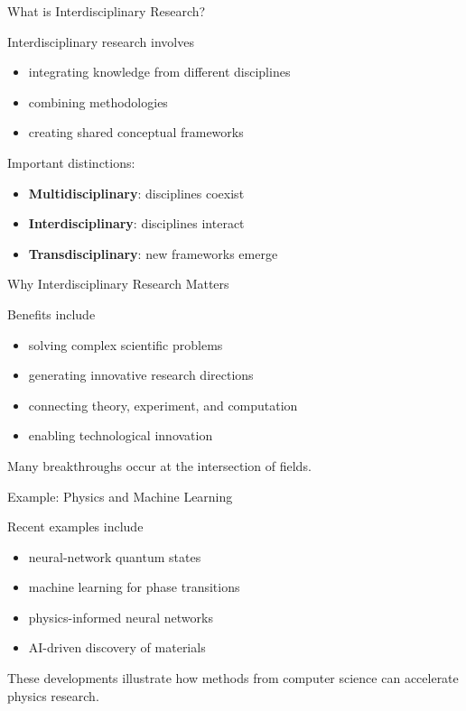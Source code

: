 \documentclass{beamer}
\begin{document}

\begin{frame}{What is Interdisciplinary Research?}

Interdisciplinary research involves

\begin{itemize}
\item integrating knowledge from different disciplines
\item combining methodologies
\item creating shared conceptual frameworks
\end{itemize}

Important distinctions:

\begin{itemize}
\item \textbf{Multidisciplinary}: disciplines coexist
\item \textbf{Interdisciplinary}: disciplines interact
\item \textbf{Transdisciplinary}: new frameworks emerge
\end{itemize}

\end{frame}


\begin{frame}{Why Interdisciplinary Research Matters}

Benefits include

\begin{itemize}
\item solving complex scientific problems
\item generating innovative research directions
\item connecting theory, experiment, and computation
\item enabling technological innovation
\end{itemize}

Many breakthroughs occur at the intersection of fields.

\end{frame}


\begin{frame}{Example: Physics and Machine Learning}

Recent examples include

\begin{itemize}
\item neural-network quantum states
\item machine learning for phase transitions
\item physics-informed neural networks
\item AI-driven discovery of materials
\end{itemize}

These developments illustrate how methods from
computer science can accelerate physics research.

\end{frame}
\end{document}
